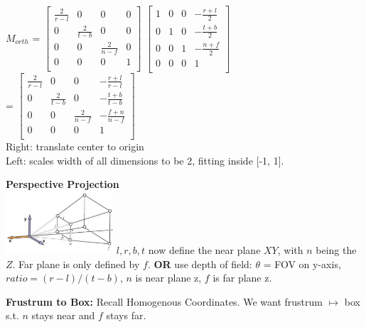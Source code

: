 \documentclass[letterpaper, 8pt]{extarticle}
\begin{document}
\begin{multicols*}{4}
$M_{orth}$ = \(
\begin{bmatrix}
    \frac{2}{r-l} & 0             & 0             & 0 \\
    0             & \frac{2}{t-b} & 0             & 0 \\
    0             & 0             & \frac{2}{n-f} & 0 \\
    0             & 0             & 0             & 1 \\
\end{bmatrix}
\)
\(
\begin{bmatrix}
    1 & 0 & 0 & -\frac{r+l}{2} \\
    0 & 1 & 0 & -\frac{t+b}{2} \\
    0 & 0 & 1 & -\frac{n+f}{2} \\
    0 & 0 & 0 & 1              \\
\end{bmatrix}
\)\\
=
\(
\begin{bmatrix}
    \frac{2}{r-l} & 0             & 0             & -\frac{r+l}{r-l} \\
    0             & \frac{2}{t-b} & 0             & -\frac{t+b}{t-b} \\
    0             & 0             & \frac{2}{n-f} & -\frac{f+n}{n-f} \\
    0             & 0             & 0             & 1                \\
\end{bmatrix}
\)\\
Right: translate center to origin\\
Left: scales width of all dimensions to be 2, fitting inside [-1, 1].

\textbf{Perspective Projection}\\
\includegraphics[width=4cm]{cam-persp.png}
$l,r,b,t$ now define the near plane $XY$, with $n$ being the $Z$. Far plane is only defined by $f$.
\textbf{OR} use depth of field:
$\theta$ = FOV on y-axis, $ratio = (r-l)/(t-b)$, $n$ is near plane z, $f$ is far plane z.

\textbf{Frustrum to Box:}
Recall Homogenous Coordinates. We want frustrum $\mapsto$ box s.t. $n$ stays near and $f$ stays far.


\end{multicols*}
\end{document}
